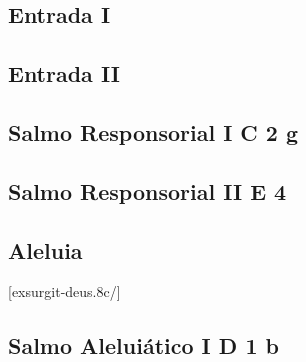 \def\Prefix{communia/commune-martyrum/}

\subsection{Entrada I}\label{subsection:communia/commune-martyrum/introitus-1}

\AllowPageFlush

\subsection{Entrada II}\label{subsection:communia/commune-martyrum/introitus-2}

\AllowPageFlush

\subsection[Salmo Responsorial I]{Salmo Responsorial I \textmd{C 2 g}}\label{subsection:communia/commune-martyrum/psalmus-responsorius-1}

\subsection[Salmo Responsorial II]{Salmo Responsorial II \textmd{E 4}}\label{subsection:communia/commune-martyrum/psalmus-responsorius-2}

\AllowPageFlush

\subsection{Aleluia}\label{subsection:communia/commune-martyrum/alleluia}
[exsurgit-deus.8c/]

\AllowPageFlush

\subsection[Salmo Aleluiático I]{Salmo Aleluiático I \textmd{D 1 b}}\label{subsection:communia/commune-martyrum/psalmus-alleluiaticus-1}

